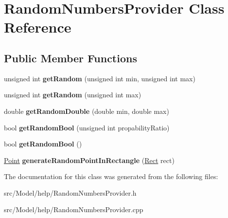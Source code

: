 \hypertarget{classRandomNumbersProvider}{}\section{Random\+Numbers\+Provider Class Reference}
\label{classRandomNumbersProvider}
\subsection*{Public Member Functions}
\begin{DoxyCompactItemize}
\item 
unsigned int {\bfseries get\+Random} (unsigned int min, unsigned int max)\hypertarget{classRandomNumbersProvider_ad7ab1dfd820a35a07b97f0389cc3b783}{}\label{classRandomNumbersProvider_ad7ab1dfd820a35a07b97f0389cc3b783}

\item 
unsigned int {\bfseries get\+Random} (unsigned int max)\hypertarget{classRandomNumbersProvider_a57e2dfd23881747ee64860ca83029550}{}\label{classRandomNumbersProvider_a57e2dfd23881747ee64860ca83029550}

\item 
double {\bfseries get\+Random\+Double} (double min, double max)\hypertarget{classRandomNumbersProvider_afc42a279bd99f4a7bbd3e6563ab4135e}{}\label{classRandomNumbersProvider_afc42a279bd99f4a7bbd3e6563ab4135e}

\item 
bool {\bfseries get\+Random\+Bool} (unsigned int propability\+Ratio)\hypertarget{classRandomNumbersProvider_afcf2d9c45021966a429e6374be696971}{}\label{classRandomNumbersProvider_afcf2d9c45021966a429e6374be696971}

\item 
bool {\bfseries get\+Random\+Bool} ()\hypertarget{classRandomNumbersProvider_a0b00490e68cd146cf8e5a0176182fb86}{}\label{classRandomNumbersProvider_a0b00490e68cd146cf8e5a0176182fb86}

\item 
\hyperlink{classPoint}{Point} {\bfseries generate\+Random\+Point\+In\+Rectangle} (\hyperlink{classRect}{Rect} rect)\hypertarget{classRandomNumbersProvider_afe99704a4081f6bf2befcc2ef7f78cd0}{}\label{classRandomNumbersProvider_afe99704a4081f6bf2befcc2ef7f78cd0}

\end{DoxyCompactItemize}


The documentation for this class was generated from the following files\+:\begin{DoxyCompactItemize}
\item 
src/\+Model/help/Random\+Numbers\+Provider.\+h\item 
src/\+Model/help/Random\+Numbers\+Provider.\+cpp\end{DoxyCompactItemize}
